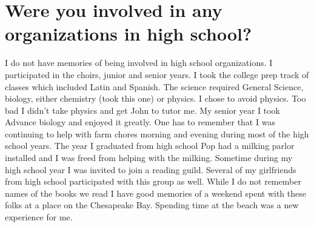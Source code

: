 \section{Were you involved in any organizations in high school?}
I do not have memories of being involved in high school organizations.
I participated in the choirs, junior and senior years.
I took the college prep track of classes which included Latin and Spanish.
The science required General Science, biology, either chemistry (took this one) or physics.
I chose to avoid physics.
Too bad I didn't take physics and get John to tutor me.
My senior year I took Advance biology and enjoyed it greatly.
One has to remember that I was continuing to help with farm chores morning and evening during most of the high school years.
The year I graduated from high school Pop had a milking parlor installed and I was freed from helping with the milking.
Sometime during my high school year I was invited to join a reading guild.
Several of my girlfriends from high school participated with this group as well.
While I do not remember names of the books we read I have good memories of a weekend spent with these folks at a place on the Chesapeake Bay.
Spending time at the beach was a new experience for me.






